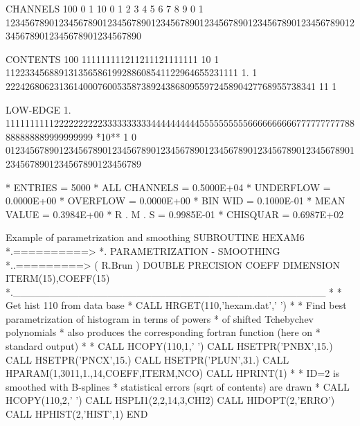 \begin{Listing}
 CHANNELS 100   0                                                                                                  1   
           10   0        1         2         3         4         5         6         7         8         9         0   
            1   1234567890123456789012345678901234567890123456789012345678901234567890123456789012345678901234567890   
 
 CONTENTS 100                               111111111211211121111111                                                
           10                 1 112233456889131356586199288608541122964655231111                                    
            1.    1    2224268062313614000760053587389243868095597245890427768955738341  11        1                
 
 LOW-EDGE   1.            111111111122222222223333333333444444444455555555556666666666777777777788888888889999999999
 *10**  1   0   0123456789012345678901234567890123456789012345678901234567890123456789012345678901234567890123456789
 
 * ENTRIES =       5000      * ALL CHANNELS = 0.5000E+04      * UNDERFLOW = 0.0000E+00      * OVERFLOW = 0.0000E+00
 * BIN WID = 0.1000E-01      * MEAN VALUE   = 0.3984E+00      * R . M . S = 0.9985E-01
 * CHISQUAR  =  0.6987E+02
\end{Listing}
\newpage
\begin{XMPt}{Example of parametrization and smoothing}
      SUBROUTINE HEXAM6
*.==========>
*.           PARAMETRIZATION      -     SMOOTHING
*..=========> ( R.Brun )
      DOUBLE PRECISION COEFF
      DIMENSION ITERM(15),COEFF(15)
*.___________________________________________
*
*             Get hist 110 from data base
*
      CALL HRGET(110,'hexam.dat',' ')
*
*       Find best parametrization of histogram in terms of powers
*       of shifted Tchebychev polynomials
*       also produces the corresponding fortran function (here on
*       standard output)
*
*
      CALL HCOPY(110,1,' ')
      CALL HSETPR('PNBX',15.)
      CALL HSETPR('PNCX',15.)
      CALL HSETPR('PLUN',31.)
      CALL HPARAM(1,3011,1.,14,COEFF,ITERM,NCO)
      CALL HPRINT(1)
*
*        ID=2 is smoothed with B-splines
*        statistical errors (sqrt of contents) are drawn
*
      CALL HCOPY(110,2,' ')
      CALL HSPLI1(2,2,14,3,CHI2)
      CALL HIDOPT(2,'ERRO')
      CALL HPHIST(2,'HIST',1)
      END
\end{XMPt}
\newpage

